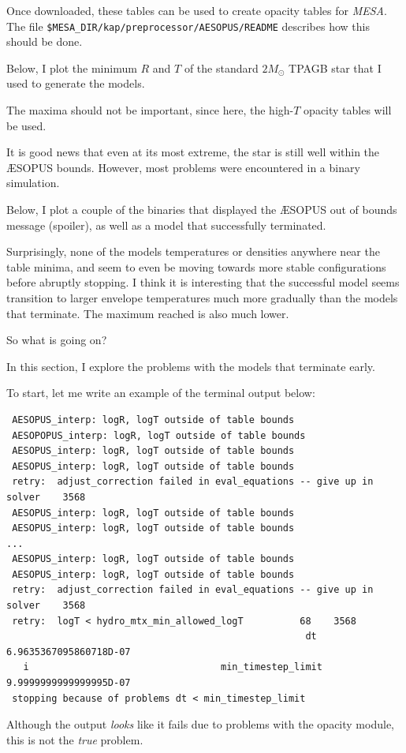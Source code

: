 \documentclass[a4paper,10pt]{article}
\begin{document}
Once downloaded, these tables can be used to create opacity tables for \emph{MESA}. The file \lstinline[style=output, breaklines=true]|$MESA_DIR/kap/preprocessor/AESOPUS/README| describes how this should be done.

Below, I plot the minimum \(R\) and \(T\) of the standard \(2M_\odot \) TPAGB star that I used to generate the models.

\begin{figure}[ht]
    \centering
\end{figure}
The maxima should not be important, since here, the high-\(T\) opacity tables will be used.

It is good news that even at its most extreme, the star is still well within the \AE SOPUS bounds.
However, most problems were encountered in a binary simulation.

Below, I plot a couple of the binaries that displayed the \AE SOPUS out of bounds message (spoiler), as well as a model that successfully terminated.

\begin{figure}[ht]
    \centering
\end{figure}

Surprisingly, none of the models temperatures or densities anywhere near the table minima, and seem to even be moving towards more stable configurations before abruptly stopping.
I think it is interesting that the successful model seems transition to larger envelope temperatures much more gradually than the models that terminate. The maximum reached is also much lower.

So what is going on?


In this section, I explore the problems with the models that terminate early.

To start, let me write an example of the terminal output below:
\begin{verbatim}
 AESOPUS_interp: logR, logT outside of table bounds
 AESOPOPUS_interp: logR, logT outside of table bounds
 AESOPUS_interp: logR, logT outside of table bounds
 AESOPUS_interp: logR, logT outside of table bounds
 retry:  adjust_correction failed in eval_equations -- give up in solver    3568
 AESOPUS_interp: logR, logT outside of table bounds
 AESOPUS_interp: logR, logT outside of table bounds
...
 AESOPUS_interp: logR, logT outside of table bounds
 AESOPUS_interp: logR, logT outside of table bounds
 retry:  adjust_correction failed in eval_equations -- give up in solver    3568
 retry:  logT < hydro_mtx_min_allowed_logT          68    3568
                                                     dt    6.9635367095860718D-07
   i                                  min_timestep_limit    9.9999999999999995D-07
 stopping because of problems dt < min_timestep_limit
\end{verbatim}
Although the output \emph{looks} like it fails due to problems with the opacity module, this is not the \emph{true} problem.
\end{document}
